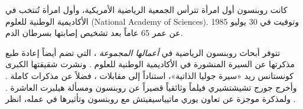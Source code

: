 \documentclass[../../../include/open-logic-section]{subfiles}
\begin{document}
كانت روبنسون أول امرأة تترأس الجمعية الرياضية الأمريكية، وأول امرأة
تُنتخب في الأكاديمية الوطنية للعلوم (National Academy of Sciences).
وتوفيت في 30 يوليو 1985 عن عمر 65 عاماً بعد تشخيص إصابتها بسرطان الدم.

\begin{reading}
تتوفر أبحاث روبنسون الرياضية في \textit{أعمالها المجموعة}
\citep{Robinson1996}، التي تضم أيضاً إعادة طبع مذكرتها عن السيرة المنشورة
في الأكاديمية الوطنية للعلوم \citep{Feferman1994}. ونشرت شقيقتها الكبرى
كونستانس ريد «سيرة جوليا الذاتية»، استناداً إلى مقابلات
\citep{Reid1986}، فضلاً عن مذكرات كاملة \citep{Reid1996}. وأخرج جورج
تشيشتشيري فيلماً وثائقياً قصيراً عن روبنسون ومسألة هيلبرت العاشرة
\citep{Csicsery2016}. ولمذكرة موجزة عن تعاون يوري ماتيياسيفيتش مع روبنسون
وتأثيرها في عمله، انظر \citep{Matijasevich1992}.
\end{reading}
\end{document}
